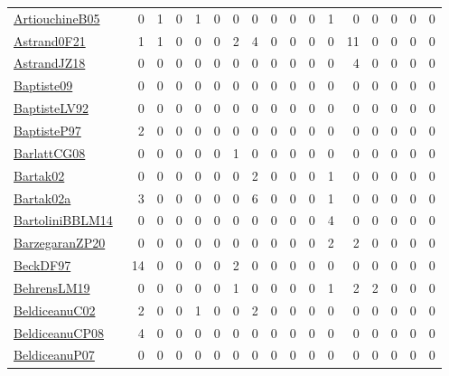 {\begin{longtable}{l*{16}{r}}
\href{papers/ArtiouchineB05.pdf}{ArtiouchineB05}~\cite{ArtiouchineB05} & 0 & 1 & 0 & 1 & 0 & 0 & 0 & 0 & 0 & 0 & 1 & 0 & 0 & 0 & 0 & 0\\
\href{papers/Astrand0F21.pdf}{Astrand0F21}~\cite{Astrand0F21} & 1 & 1 & 0 & 0 & 0 & 2 & 4 & 0 & 0 & 0 & 0 & 11 & 0 & 0 & 0 & 0\\
\href{papers/AstrandJZ18.pdf}{AstrandJZ18}~\cite{AstrandJZ18} & 0 & 0 & 0 & 0 & 0 & 0 & 0 & 0 & 0 & 0 & 0 & 4 & 0 & 0 & 0 & 0\\
\href{papers/Baptiste09.pdf}{Baptiste09}~\cite{Baptiste09} & 0 & 0 & 0 & 0 & 0 & 0 & 0 & 0 & 0 & 0 & 0 & 0 & 0 & 0 & 0 & 0\\
\href{papers/BaptisteLV92.pdf}{BaptisteLV92}~\cite{BaptisteLV92} & 0 & 0 & 0 & 0 & 0 & 0 & 0 & 0 & 0 & 0 & 0 & 0 & 0 & 0 & 0 & 0\\
\href{papers/BaptisteP97.pdf}{BaptisteP97}~\cite{BaptisteP97} & 2 & 0 & 0 & 0 & 0 & 0 & 0 & 0 & 0 & 0 & 0 & 0 & 0 & 0 & 0 & 0\\
\href{papers/BarlattCG08.pdf}{BarlattCG08}~\cite{BarlattCG08} & 0 & 0 & 0 & 0 & 0 & 1 & 0 & 0 & 0 & 0 & 0 & 0 & 0 & 0 & 0 & 0\\
\href{papers/Bartak02.pdf}{Bartak02}~\cite{Bartak02} & 0 & 0 & 0 & 0 & 0 & 0 & 2 & 0 & 0 & 0 & 1 & 0 & 0 & 0 & 0 & 0\\
\href{papers/Bartak02a.pdf}{Bartak02a}~\cite{Bartak02a} & 3 & 0 & 0 & 0 & 0 & 0 & 6 & 0 & 0 & 0 & 1 & 0 & 0 & 0 & 0 & 0\\
\href{papers/BartoliniBBLM14.pdf}{BartoliniBBLM14}~\cite{BartoliniBBLM14} & 0 & 0 & 0 & 0 & 0 & 0 & 0 & 0 & 0 & 0 & 4 & 0 & 0 & 0 & 0 & 0\\
\href{papers/BarzegaranZP20.pdf}{BarzegaranZP20}~\cite{BarzegaranZP20} & 0 & 0 & 0 & 0 & 0 & 0 & 0 & 0 & 0 & 0 & 2 & 2 & 0 & 0 & 0 & 0\\
\href{papers/BeckDF97.pdf}{BeckDF97}~\cite{BeckDF97} & 14 & 0 & 0 & 0 & 0 & 2 & 0 & 0 & 0 & 0 & 0 & 0 & 0 & 0 & 0 & 0\\
\href{papers/BehrensLM19.pdf}{BehrensLM19}~\cite{BehrensLM19} & 0 & 0 & 0 & 0 & 0 & 1 & 0 & 0 & 0 & 0 & 1 & 2 & 2 & 0 & 0 & 0\\
\href{papers/BeldiceanuC02.pdf}{BeldiceanuC02}~\cite{BeldiceanuC02} & 2 & 0 & 0 & 1 & 0 & 0 & 2 & 0 & 0 & 0 & 0 & 0 & 0 & 0 & 0 & 0\\
\href{papers/BeldiceanuCP08.pdf}{BeldiceanuCP08}~\cite{BeldiceanuCP08} & 4 & 0 & 0 & 0 & 0 & 0 & 0 & 0 & 0 & 0 & 0 & 0 & 0 & 0 & 0 & 0\\
\href{papers/BeldiceanuP07.pdf}{BeldiceanuP07}~\cite{BeldiceanuP07} & 0 & 0 & 0 & 0 & 0 & 0 & 0 & 0 & 0 & 0 & 0 & 0 & 0 & 0 & 0 & 0\\

\end{longtable}}
